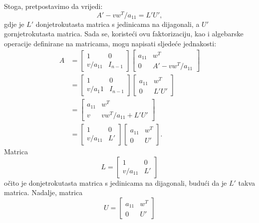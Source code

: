 \documentclass[a4paper,12pt,oneside]{article}
\begin{document}
Stoga, pretpostavimo da vrijedi:
$$A' - vw^T/a_{11} = L'U',$$
gdje je $L'$ donjetrokutasta matrica s jedinicama na dijagonali, a $U'$ gornjetrokutasta matrica.\newline\newline
\noindent Sada se, koristeći ovu faktorizaciju, kao i algebarske operacije definirane na matricama, mogu napisati sljedeće jednakosti:
\begin{align*}
A &= \left[\begin{array}{cc}1 & 0 \\
	v/a_{11} &I_{n-1} \end{array}\right]  \left[\begin{array}{cc}a_{11} & w^T \\
	0 &A' - vw^T/a_{11}\end{array}\right] \\[7pt]
	&= \left[\begin{array}{cc}1 & 0 \\
		v/a_{1}1 &I_{n-1} \end{array}\right]  \left[\begin{array}{cc}a_{11} & w^T \\ 
		0 & L'U' \end{array}\right]  \\[7pt]
	&= \left[\begin{array}{cc}a_{11} & w^T \\
		v & vw^T/a_{11} + L'U' \end{array}\right]\\[7pt]
	&=  \left[\begin{array}{cc}1 & 0 \\
		v/a_{11} &L' \end{array}\right]\left[\begin{array}{cc}a_{11} & w^T \\
		0 & U' \end{array}\right]. 
\end{align*}
Matrica
$$
L =  \left[\begin{array}{cc}1 & 0 \\
	v/a_{11} &L' \end{array}\right]
$$
očito je donjetrokutasta matrica s jedinicama na dijagonali, budući da je $L'$ takva matrica. \newline\newline
\noindent Nadalje, matrica 
$$
 U = \left[\begin{array}{cc}a_{11} & w^T \\
	0 & U' \end{array}\right] 
$$
\end{document}
